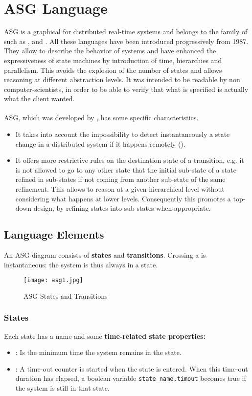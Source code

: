 \documentclass[../main.tex]{subfiles}
\begin{document}
\chapter{ASG Language}
ASG is a graphical  for distributed real-time systems and belongs to the family of  such as ,  and .
All these languages have been introduced progressively from 1987.
They allow to describe the behavior of systems and have enhanced the expressiveness of state machines by introduction of time, hierarchies and parallelism.
This avoids the explosion of the number of states and allows reasoning at different abstraction levels.
It was intended to be readable by non computer-scientists, in order to be able to verify that what is specified is actually what the client wanted.
\\\\
ASG, which was developed by , has some specific characteristics.
\begin{itemize}
	\item It takes into account the impossibility to detect instantaneously a state change in a distributed system if it happens remotely ().
	\item It offers more restrictive rules on the destination state of a transition, e.g. it is not allowed to go to any other state that the initial sub-state of a state refined in sub-states if not coming from another sub-state of the same refinement.
    This allows to reason at a given hierarchical level without considering what happens at lower levels.
    Consequently this promotes a top-down design, by refining states into sub-states when appropriate.
\end{itemize}

\section{Language Elements}
An ASG diagram consists of \textbf{states} and \textbf{transitions}. Crossing a  is instantaneous: the system is thus always in a state.
\begin{figure}[H]
    \centering
    \texttt{[image: asg1.jpg]}
    \caption{ASG States and Transitions}
    \label{asg1}
\end{figure}

\subsection{States}
Each state has a name and some \textbf{time-related state properties:}
\begin{itemize}
	\item {}: Is the minimum time the system remains in the state.
	\item {}: A time-out counter is started when the state is entered. When this time-out duration has elapsed, a boolean variable \texttt{state\_name.timout} becomes true if the system is still in that state.
\end{itemize}
\end{document}
